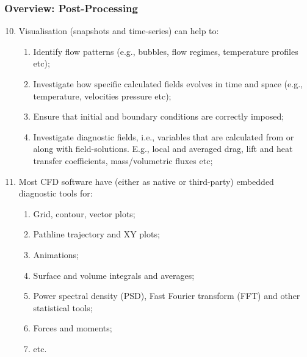 \documentclass[10pt,compress,handout,ignorenonframetext]{beamer}
\begin{document}
\begin{frame}
 \frametitle{Overview: Post-Processing} 
\begin{enumerate}
  \setcounter{enumi}{9}
  \item <1-> Visualisation (snapshots and time-series) can help to:
      \begin{enumerate}
         \item <2-> Identify flow patterns (e.g., bubbles, flow regimes, temperature profiles etc);
         \item <3-> Investigate how specific calculated fields evolves in time and space (e.g., temperature, velocities pressure etc);
         \item <4-> Ensure that initial and boundary conditions are correctly imposed;
         \item <5-> Investigate diagnostic fields, i.e., variables that are calculated from or along with field-solutions. E.g., local and averaged drag, lift and heat transfer coefficients, mass/volumetric fluxes etc;
      \end{enumerate}
  \item <6-> Most CFD software have (either as native or third-party) embedded diagnostic tools for:
      \begin{enumerate}
         \item <7-> Grid, contour, vector plots;
         \item <8-> Pathline trajectory and XY plots;
         \item <9-> Animations;
         \item <10-> Surface and volume integrals and averages;
         \item <11-> Power spectral density (PSD), Fast Fourier transform (FFT) and other statistical tools;
         \item <12-> Forces and moments;
         \item <13-> etc.
      \end{enumerate}

\end{enumerate}

\end{frame}
 
\end{document}
